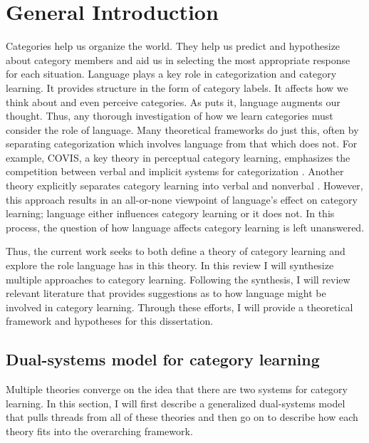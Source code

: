 \documentclass[../dissertation.tex]{subfiles}
\begin{document}
\section{General Introduction}\label{intro}

	Categories help us organize the world. They help us predict and hypothesize about category members and aid us in selecting the most appropriate response for each situation. Language plays a key role in categorization and category learning. It provides structure in the form of category labels. It affects how we think about and even perceive categories. As \citet{Lupyan2012} puts it, language augments our thought. Thus, any thorough investigation of how we learn categories must consider the role of language. Many theoretical frameworks do just this, often by separating categorization which involves language from that which does not. For example, COVIS, a key theory in perceptual category learning, emphasizes the competition between verbal and implicit systems for categorization \citep{Ashby1998}. Another theory explicitly separates category learning into verbal and nonverbal \citep{Minda2010}. However, this approach results in an all-or-none viewpoint of language's effect on category learning; language either influences category learning or it does not. In this process, the question of how language affects category learning is left unanswered. \par
	Thus, the current work seeks to both define a theory of category learning and explore the role language has in this theory. In this review I will synthesize multiple approaches to category learning. Following the synthesis, I will review relevant literature that provides suggestions as to how language might be involved in category learning. Through these efforts, I will provide a theoretical framework and hypotheses for this dissertation.

\subsection{Dual-systems model for category learning}
	Multiple theories converge on the idea that there are two systems for category learning. In this section, I will first describe a generalized dual-systems model that pulls threads from all of these theories and then go on to describe how each theory fits into the overarching framework. 
	
\end{document}
